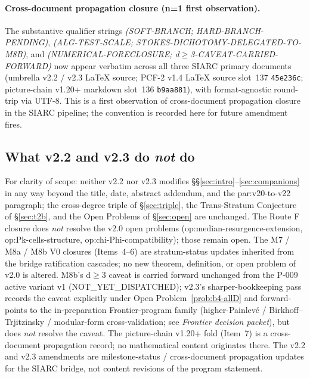\documentclass[11pt,a4paper]{article}
\theoremstyle{definition}
\theoremstyle{remark}
\begin{document}
\paragraph{Cross-document propagation closure (n=1 first observation).}
The substantive qualifier strings \emph{(SOFT-BRANCH; HARD-BRANCH-PENDING)},
\emph{(ALG-TEST-SCALE; STOKES-DICHOTOMY-DELEGATED-TO-M8B)}, and
\emph{(NUMERICAL-FORECLOSURE; d$\geq$3-CAVEAT-CARRIED-FORWARD)} now
appear verbatim across all three SIARC primary documents (umbrella
v2.2 / v2.3 \LaTeX{} source; PCF-2 v1.4 \LaTeX{} source slot~137
\texttt{45e236c}; picture-chain v1.20+ markdown slot~136
\texttt{b9aa881}), with format-agnostic round-trip via UTF-8. This
is a first observation of cross-document propagation closure in the
SIARC pipeline; the convention is recorded here for future
amendment fires.

\subsection{What v2.2 and v2.3 do \emph{not} do}
\label{sec:closure-cascade-out-of-scope}

For clarity of scope: neither v2.2 nor v2.3 modifies
\S\S\ref{sec:intro}--\ref{sec:companions} in any way beyond the
title, date, abstract addendum, and the \textsf{par:v20-to-v22}
paragraph; the cross-degree triple of \S\ref{sec:triple}, the
Trans-Stratum Conjecture of \S\ref{sec:t2b}, and the Open Problems
of \S\ref{sec:open} are unchanged. The Route F closure does
\emph{not} resolve the v2.0 open problems
(\textsf{op:median-resurgence-extension}, \textsf{op:Pk-cells-structure},
\textsf{op:chi-Phi-compatibility}); those remain open. The M7 /
M8a / M8b V0 closures (Items~4--6) are stratum-status updates
inherited from the bridge ratification cascades; no new theorem,
definition, or open problem of v2.0 is altered. M8b's d$\geq$3
caveat is carried forward unchanged from the P-009 active variant
v1 (\textsf{NOT\_YET\_DISPATCHED}); v2.3's sharper-bookkeeping pass
records the caveat explicitly under Open
Problem~\ref{prob:b4-allD} and forward-points to the
in-preparation Frontier-program family (higher-Painlev\'e /
Birkhoff--Trjitzinsky / modular-form cross-validation; see
\emph{Frontier decision packet}), but does \emph{not} resolve the
caveat. The picture-chain v1.20+ fold (Item~7) is a cross-document
propagation record; no mathematical content originates there. The
v2.2 and v2.3 amendments are milestone-status / cross-document
propagation updates for the SIARC bridge, not content revisions of
the program statement.
\end{document}
